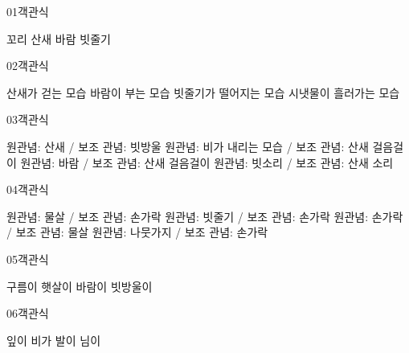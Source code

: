 \documentclass[fs9,seriesRus]{korfarm-base}
\begin{document}

\par\medskip
\kfBeginMC
\begin{kfQBlock}{01}{객관식}
\begin{kfChoices}
\kfChoice 꼬리
\kfChoice 산새
\kfChoice 바람
\kfChoice 빗줄기
\end{kfChoices}
\end{kfQBlock}
\begin{kfQBlock}{02}{객관식}
\begin{kfChoices}
\kfChoice 산새가 걷는 모습
\kfChoice 바람이 부는 모습
\kfChoice 빗줄기가 떨어지는 모습
\kfChoice 시냇물이 흘러가는 모습
\end{kfChoices}
\end{kfQBlock}
\begin{kfQBlock}{03}{객관식}
\begin{kfChoices}
\kfChoice 원관념: 산새 / 보조 관념: 빗방울
\kfChoice 원관념: 비가 내리는 모습 / 보조 관념: 산새 걸음걸이
\kfChoice 원관념: 바람 / 보조 관념: 산새 걸음걸이
\kfChoice 원관념: 빗소리 / 보조 관념: 산새 소리
\end{kfChoices}
\end{kfQBlock}
\begin{kfQBlock}{04}{객관식}
\begin{kfChoices}
\kfChoice 원관념: 물살 / 보조 관념: 손가락
\kfChoice 원관념: 빗줄기 / 보조 관념: 손가락
\kfChoice 원관념: 손가락 / 보조 관념: 물살
\kfChoice 원관념: 나뭇가지 / 보조 관념: 손가락
\end{kfChoices}
\end{kfQBlock}
\begin{kfQBlock}{05}{객관식}
\begin{kfChoices}
\kfChoice 구름이
\kfChoice 햇살이
\kfChoice 바람이
\kfChoice 빗방울이
\end{kfChoices}
\end{kfQBlock}
\begin{kfQBlock}{06}{객관식}
\begin{kfChoices}
\kfChoice 잎이
\kfChoice 비가
\kfChoice 발이
\kfChoice 님이
\end{kfChoices}
\end{kfQBlock}
\end{document}
